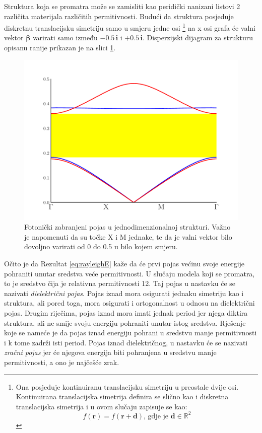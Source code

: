 \documentclass[utf8, seminar, numeric]{fer}
\begin{document}
Struktura koja se promatra može se zamisliti kao peridički nanizani listovi 2
različita materijala različitih permitivnosti. Budući da struktura posjeduje
diskretnu translacijsku simetriju samo u smjeru jedne osi
\footnote{
	Ona posjeduje kontinuiranu translacijsku simetriju u preostale dvije osi.
	Kontinuirana translacijska simetrija definira se slično kao i diskretna
	translacijska simetrija i u ovom slučaju zapisuje se kao:
	$$f(\mathbf{r}) = f(\mathbf{r} + \mathbf{d})
	\text{, gdje je }{\mathbf{d} \in \mathbb{R}^2}$$
}
na x osi grafa će valni vektor ${\bm{\beta}}$ varirati samo između
$-0.5 \, \mathbf{i}$ i $+0.5 \, \mathbf{i}$. Disperzijski dijagram za strukturu
opisanu ranije prikazan je na slici \ref{fig:1d_band_diagram}.
\begin{figure}[ht]
	\centering
	\includegraphics[width = 0.8\linewidth]{./images/pdf/1d_crystal_band_gap.pdf}
	\caption{Fotonički zabranjeni pojas u jednodimenzionalnoj strukturi.
	Važno je napomenuti da su točke X i M jednake, te da je valni vektor bilo
	dovoljno varirati od 0 do 0.5 u bilo kojem smjeru.}
	\label{fig:1d_band_diagram}
\end{figure}

Očito je da 
Rezultat \ref{eq:rayleighE} kaže da će prvi pojas većinu svoje energije
pohraniti unutar sredstva veće permitivnosti. U slučaju modela koji se
promatra, to je sredstvo čija je relativna permitivnosti 12. Taj pojas
u nastavku će se nazivati \emph{dielektrični pojas}. Pojas iznad mora
osigurati jednaku simetriju kao i struktura, ali pored toga, mora osigurati i
ortogonalnost u odnosu na dielektrični pojas. Drugim riječima, pojas iznad
mora imati jednak period jer njega diktira struktura, ali ne smije svoju
energiju pohraniti unutar istog sredstva. Rješenje koje se nameće je da pojas
iznad energiju pohrani u sredstvu manje permitivnosti i k tome zadrži
isti period. Pojas iznad dielektričnog, u nastavku će se nazivati \emph{zračni
pojas} jer će njegova energija biti pohranjena u sredstvu manje permitivnosti,
a ono je najčešće zrak.
\end{document}
